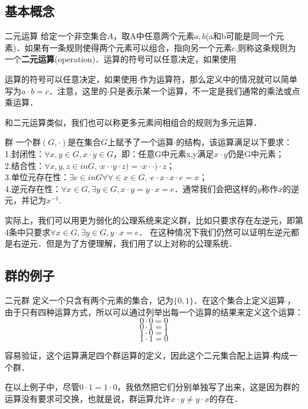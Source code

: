 
\subsection{基本概念}

\begin{definition}{二元运算}
给定一个非空集合$A$，取A中任意两个元素$a, b$(a和b可能是同一个元素)．如果有一条规则使得两个元素可以组合，指向另一个元素$c$,则称这条规则为一个\textbf{二元运算}(operation)．运算的符号可以任意决定，如果使用
\end{definition}

运算的符号可以任意决定，如果使用$\cdot$作为运算符，那么定义中的情况就可以简单写为$a\cdot b=c$．注意，这里的$\cdot$只是表示某一个运算，不一定是我们通常的乘法或点乘运算．

和二元运算类似，我们也可以称更多元素间相组合的规则为多元运算．

\begin{definition}{群}
一个群$(G, \cdot)$是在集合$G$上赋予了一个运算$\cdot$的结构，该运算满足以下要求：\\


1.封闭性：$\forall x, y\in G, x\cdot y\in G$，即：任意G中元素x,y满足$x\cdot y$仍是G中元素；\\

2.结合性：$\forall x, y, z\in in G,\cdot x·\cdot y· z)=\cdot x· \cdot)· z$；\\

3.单位元存在性：$\exists e\in in G\forall ∀\in x∈ G,\cdot e· x\cdot x· e=x$；\\

4.逆元存在性：$\forall x\in G, \exists y\in G, x\cdot y=y\cdot x=e$．通常我们会把这样的$y$称作$x$的逆元，并记为$x^{-1}$. 

\end{definition}

实际上，我们可以用更为弱化的公理系统来定义群，比如只要求存在左逆元，即第4条中只要求$\forall x\in G, \exists y\in G, y\cdot x=e$． 在这种情况下我们仍然可以证明左逆元都是右逆元．但是为了方便理解，我们用了以上对称的公理系统．

\subsection{群的例子}


\begin{example}{二元群}\label{Group_ex1}
定义一个只含有两个元素的集合，记为$\{0, 1\}$．在这个集合上定义运算$\cdot$，由于只有四种运算方式，所以可以通过列举出每一个运算的结果来定义这个运算：
$$0\cdot0=0$$
$$0\cdot1=1$$
$$1\cdot0=1$$
$$1\cdot1=0$$

容易验证，这个运算满足四个群运算的定义，因此这个二元集合配上运算$\cdot$构成一个群．

\end{example}

在以上例子中，尽管$0\cdot1=1\cdot0$，我依然把它们分别单独写了出来，这是因为群的运算没有要求可交换，也就是说，群运算允许$x\cdot y\neq y\cdot x$的存在．
